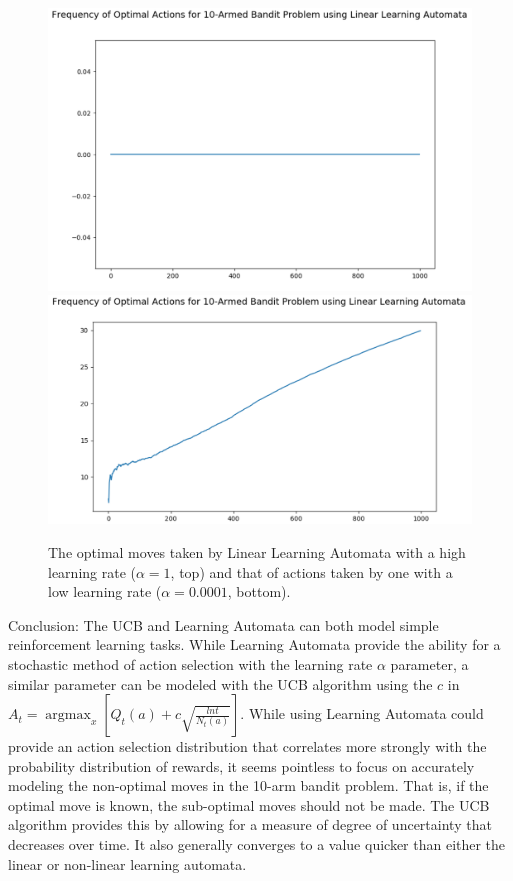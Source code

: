 \documentclass{article}
\DeclareMathOperator*{\argmax}{argmax}
\begin{document}
\begin{enumerate}
	\begin{figure}[h]
	\centering
	\includegraphics[scale=0.2]{lla_opt_hlr}
	\includegraphics[scale=0.2]{lla_opt_llr}
	\caption{The optimal moves taken by Linear Learning Automata with a high learning rate ($\alpha=1$, top) and that of actions taken by one with a low learning rate ($\alpha=0.0001$, bottom).}
	\end{figure}
	
	\end{enumerate}
	Conclusion: The UCB and Learning Automata can both model simple reinforcement learning tasks. While Learning Automata provide the ability for a stochastic method of action selection with the learning rate $\alpha$ parameter, a similar parameter can be modeled with the UCB algorithm using the $c$ in $A_t = \argmax_x [Q_t(a) + c\sqrt{\frac{lnt}{N_t(a)}}]$. While using Learning Automata could provide an action selection distribution that correlates more strongly with the probability distribution of rewards, it seems pointless to focus on accurately modeling the non-optimal moves in the 10-arm bandit problem. That is, if the optimal move is known, the sub-optimal moves should not be made. The UCB algorithm provides this by allowing for a measure of degree of uncertainty that decreases over time. It also generally converges to a value quicker than either the linear or non-linear learning automata.
	
	
	
	
\end{document}
